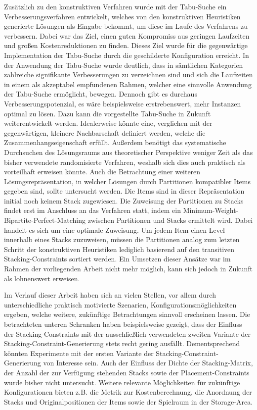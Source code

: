 Zusätzlich zu den konstruktiven Verfahren wurde mit der Tabu-Suche ein Verbesserungsverfahren entwickelt,
welches von den konstruktiven Heuristiken generierte Lösungen als Eingabe bekommt, um diese
im Laufe des Verfahrens zu verbessern. Dabei war das Ziel, einen guten Kompromiss aus geringen Laufzeiten
und großen Kostenreduktionen zu finden. Dieses Ziel wurde für die gegenwärtige Implementation der Tabu-Suche durch die geschilderte Konfiguration erreicht. In der Anwendung der Tabu-Suche wurde deutlich, dass in sämtlichen Kategorien zahlreiche signifikante Verbesserungen zu verzeichnen sind und sich die Laufzeiten in einem als akzeptabel empfundenen Rahmen, welcher eine sinnvolle Anwendung der Tabu-Suche ermöglicht, bewegen.
Dennoch gibt es durchaus Verbesserungspotenzial, es wäre beispielsweise erstrebenswert,
mehr Instanzen optimal zu lösen. Dazu kann die vorgestellte Tabu-Suche in Zukunft weiterentwickelt werden.
Idealerweise könnte eine, verglichen mit der gegenwärtigen, kleinere Nachbarschaft definiert werden, welche die Zusammenhangseigenschaft erfüllt.
Außerdem benötigt das systematische Durchsuchen des Lösungsraums aus theoretischer Perspektive weniger Zeit
als das bisher verwendete randomisierte Verfahren, weshalb sich dies auch praktisch als vorteilhaft erweisen könnte.
Auch die Betrachtung einer weiteren Lösungsrepräsentation, in welcher Lösungen durch Partitionen kompatibler Items
gegeben sind, sollte untersucht werden. Die Items sind in dieser Repräsentation initial noch
keinem Stack zugewiesen. Die Zuweisung der Partitionen zu Stacks findet erst im Anschluss an das Verfahren statt, indem ein Minimum-Weight-Bipartite-Perfect-Matching zwischen Partitionen und Stacks ermittelt wird. Dabei handelt es sich um eine optimale Zuweisung. Um jedem Item einen Level innerhalb eines Stacks zuzuweisen, müssen die Partitionen
analog zum letzten Schritt der konstruktiven Heuristiken lediglich basierend auf den transitiven Stacking-Constraints
sortiert werden. Ein Umsetzen dieser Ansätze war im Rahmen der vorliegenden Arbeit nicht mehr möglich, kann sich
jedoch in Zukunft als lohnenswert erweisen.

Im Verlauf dieser Arbeit haben sich an vielen Stellen, vor allem durch unterschiedliche praktisch motivierte Szenarien, Konfigurationsmöglichkeiten ergeben, welche weitere, zukünftige Betrachtungen sinnvoll erscheinen lassen.
Die betrachteten unteren Schranken haben beispielsweise gezeigt, dass der Einfluss der Stacking-Constraints mit der ausschließlich verwendeten zweiten Variante der Stacking-Constraint-Generierung stets recht gering ausfällt. Dementsprechend könnten Experimente mit der ersten Variante der Stacking-Constraint-Generierung von Interesse sein.
Auch der Einfluss der Dichte der Stacking-Matrix, der Anzahl der zur Verfügung stehenden Stacks sowie der Placement-Constraints wurde bisher nicht untersucht. Weitere relevante Möglichkeiten für zukünftige Konfigurationen bieten z.B. die Metrik zur Kostenberechnung, die Anordnung der Stacks und Originalpositionen der Items sowie der Spielraum in der Storage-Area.

